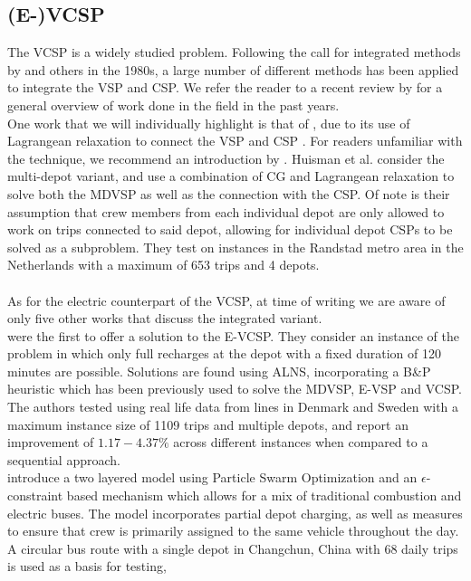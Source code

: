 \documentclass[]{article}
\begin{document}
\subsection{(E-)VCSP}
The VCSP is a widely studied problem. Following the call for integrated methods by \citet{Bodin1983} and others in the 1980s, a large number of different methods has been applied to integrate the VSP and CSP. We refer the reader to a recent review by \citet{Ge2024} for a general overview of work done in the field in the past years. \\
One work that we will individually highlight is that of \citet{Huisman2005}, due to its use of Lagrangean relaxation to connect the VSP and CSP . For readers unfamiliar with the technique, we recommend an introduction by \citet{Beasley1993}. Huisman et al. consider the multi-depot variant, and use a combination of CG and Lagrangean relaxation to solve both the MDVSP as well as the connection with the CSP. Of note is their assumption that crew members from each individual depot are only allowed to work on trips connected to said depot, allowing for individual depot CSPs to be solved as a subproblem. They test on instances in the Randstad metro area in the Netherlands with a maximum of 653 trips and 4 depots. \\\\
As for the electric counterpart of the VCSP, at time of writing we are aware of only five other works that discuss the integrated variant. \\
\citet{Perumal2021} were the first to offer a solution to the E-VCSP. They consider an instance of the problem in which only full recharges at the depot with a fixed duration of 120 minutes are possible. Solutions are found using ALNS, incorporating a B\&P heuristic which has been previously used to solve the MDVSP, E-VSP and VCSP. The authors tested using real life data from lines in Denmark and Sweden with a
maximum instance size of 1109 trips and multiple depots, and report an improvement of $1.17-4.37\%$
across different instances when compared to a sequential approach. \\
\citet{Wang2022} introduce a two layered model using Particle Swarm Optimization and an
$\epsilon$-constraint based mechanism which allows for a mix of traditional
combustion and electric buses. The model incorporates partial
depot charging, as well as measures to ensure that crew is primarily assigned
to the same vehicle throughout the day. A circular bus route with a single
depot in Changchun, China with 68 daily trips is used as a basis for testing,
\end{document}
